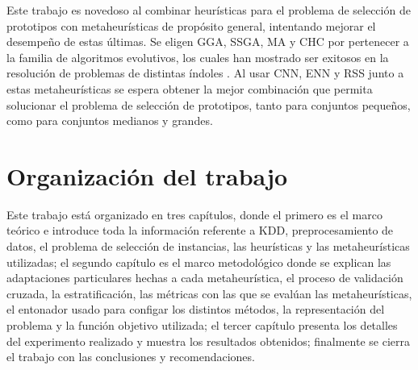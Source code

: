 Este trabajo es novedoso al combinar heurísticas para el problema de selección de prototipos con metaheurísticas de propósito general, intentando mejorar el desempeño de estas últimas. Se eligen GGA, SSGA, MA y CHC por pertenecer a la familia de algoritmos evolutivos, los cuales han mostrado ser exitosos en la resolución de problemas de distintas índoles \cite{han2011data}. Al usar CNN, ENN y RSS junto a estas metaheurísticas se espera obtener la mejor combinación que permita solucionar el problema de selección de prototipos, tanto para conjuntos pequeños, como para conjuntos medianos y grandes.

\section{Organización del trabajo}

Este trabajo está organizado en tres capítulos, donde el primero es el marco teórico e introduce toda la información referente a KDD, preprocesamiento de datos, el problema de selección de instancias, las heurísticas y las metaheurísticas utilizadas; el segundo capítulo es el marco metodológico donde se explican las adaptaciones particulares hechas a cada metaheurística, el proceso de validación cruzada, la estratificación, las métricas con las que se evalúan las metaheurísticas, el entonador usado para configar los distintos métodos, la representación del problema y la función objetivo utilizada; el tercer capítulo presenta los detalles del experimento realizado y muestra los resultados obtenidos; finalmente se cierra el trabajo con las conclusiones y recomendaciones.